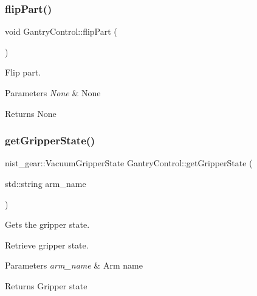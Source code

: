 \subsubsection{\texorpdfstring{flip\+Part()}{flipPart()}}
{\footnotesize\ttfamily void Gantry\+Control\+::flip\+Part (\begin{DoxyParamCaption}{ }\end{DoxyParamCaption})}



Flip part. 


\begin{DoxyParams}{Parameters}
{\em None} & None \\
\hline
\end{DoxyParams}
\begin{DoxyReturn}{Returns}
None 
\end{DoxyReturn}
\mbox{\label{classGantryControl_a986691834604135cf47b1c070f8d915e}} 
\subsubsection{\texorpdfstring{get\+Gripper\+State()}{getGripperState()}}
{\footnotesize\ttfamily nist\+\_\+gear\+::\+Vacuum\+Gripper\+State Gantry\+Control\+::get\+Gripper\+State (\begin{DoxyParamCaption}\item[{std\+::string}]{arm\+\_\+name }\end{DoxyParamCaption})}



Gets the gripper state. 

Retrieve gripper state.


\begin{DoxyParams}{Parameters}
{\em arm\+\_\+name} & Arm name \\
\hline
\end{DoxyParams}
\begin{DoxyReturn}{Returns}
Gripper state 
\end{DoxyReturn}
\mbox{\label{classGantryControl_ab475e912ab1ea0d13efc10078695102e}} 
